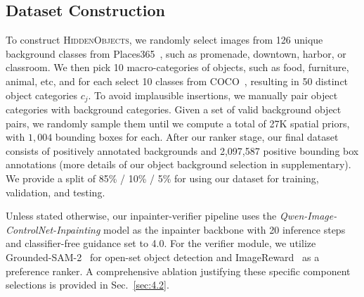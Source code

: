 




\subsection{Dataset Construction}
\label{dataprep}

To construct \textsc{HiddenObjects}, we randomly select images from 126 unique background classes from Places365~\cite{zhou2017places}, such as promenade, downtown, harbor, or classroom. We then pick 10 macro-categories of objects, such as food, furniture, animal, etc, and for each select 10 classes from COCO~\cite{lin2014microsoft}, resulting in 50 distinct object categories $c_j$. To avoid implausible insertions, we manually pair object categories with background categories. Given a set of valid background object pairs, we randomly sample them until we compute a total of 27K spatial priors, with $1,004$ bounding boxes for each. After our ranker stage, our final dataset consists of \numscenes positively annotated backgrounds and 2,097,587 positive bounding box annotations (more details of our object background selection in supplementary). We provide a split of 85\% / 10\% / 5\% for using our dataset for training, validation, and testing. 

 Unless stated otherwise, our inpainter-verifier pipeline uses the \textit{Qwen-Image-ControlNet-Inpainting} \cite{wu2025qwen} model as the inpainter backbone with 20 inference steps and classifier-free guidance set to 4.0. For the verifier module, we utilize Grounded-SAM-2~\cite{ren2024grounded} for open-set object detection and ImageReward~\cite{xu2023imagereward} as a preference ranker. A comprehensive ablation justifying these specific component selections is provided in Sec.~\ref{sec:4.2}. 


